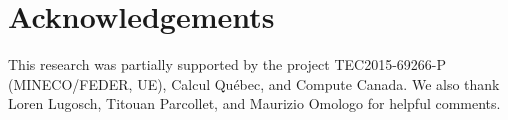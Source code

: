 \documentclass[a4paper]{article}
\begin{document}
\section{Acknowledgements}

This research was partially supported by the project TEC2015-69266-P (MINECO/FEDER, UE), Calcul Qu\'ebec, and Compute Canada. 
We also thank Loren Lugosch, Titouan Parcollet, and Maurizio Omologo for helpful comments. 






\end{document}
